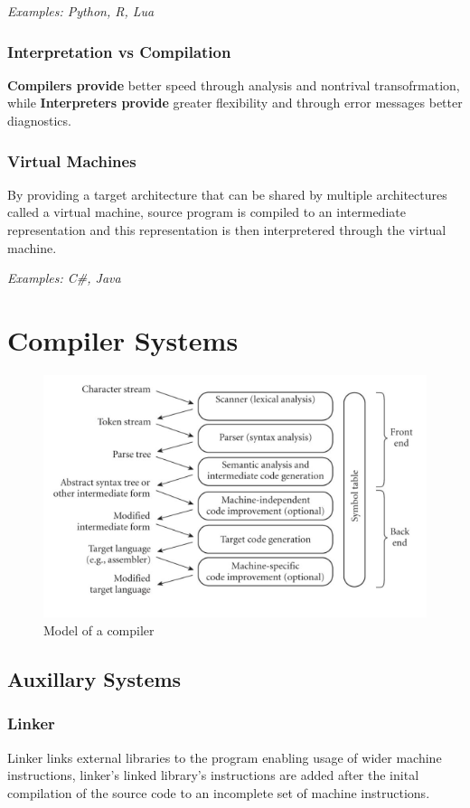 \documentclass[11pt]{book}
\begin{document}
\textit{Examples: Python, R, Lua}

\subsubsection{Interpretation vs Compilation}
\textbf{Compilers provide} better speed through analysis and nontrival transofrmation, while \textbf{Interpreters provide} greater flexibility and through error messages better diagnostics.

\subsubsection{Virtual Machines}
By providing a target architecture that can be shared by multiple architectures called a virtual machine, source program is compiled to an intermediate representation and this representation is then interpretered through the virtual machine.

\textit{Examples: C\#, Java}

\section{Compiler Systems}

\begin{figure}[h!]
	\center
	\includegraphics[scale=0.5]{../figures/01_phases_of_compilation.png}
	\caption{Model of a compiler}
\end{figure}

\subsection{Auxillary Systems}
\subsubsection{Linker}
Linker links external libraries to the program enabling usage of wider machine instructions, linker's linked library's instructions are added after the inital compilation of the source code to an incomplete set of machine instructions.
\end{document}
